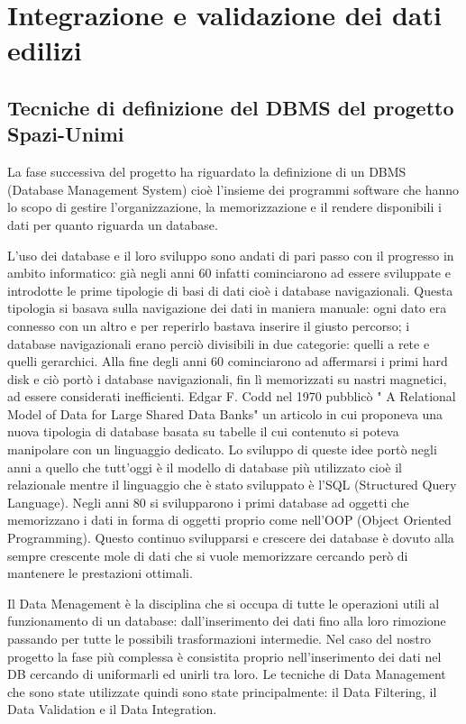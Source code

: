 \documentclass[12pt]{report}
\begin{document}
\chapter{Integrazione e validazione dei dati edilizi}
\label{cap2}

\section{Tecniche di definizione del DBMS del progetto Spazi-Unimi}

La fase successiva del progetto ha riguardato la definizione di un DBMS (Database Management System) cioè l'insieme dei programmi software che hanno lo scopo di gestire l'organizzazione, la memorizzazione e il rendere disponibili i dati per quanto riguarda un database.

L'uso dei database e il loro sviluppo sono andati di pari passo con il progresso in ambito informatico: già negli anni 60 infatti cominciarono ad essere sviluppate e introdotte le prime tipologie di basi di dati cioè i database navigazionali. 
Questa tipologia si basava sulla navigazione dei dati in maniera manuale: ogni dato era connesso con un altro e per reperirlo bastava inserire il giusto percorso; i database navigazionali erano perciò divisibili in due categorie: quelli a rete e quelli gerarchici.
Alla fine degli anni 60 cominciarono ad affermarsi i primi hard disk e ciò portò i database navigazionali, fin lì memorizzati su nastri magnetici, ad essere considerati inefficienti. 
Edgar F. Codd nel 1970 pubblicò " A Relational Model of Data for Large Shared Data Banks" un articolo in cui proponeva una nuova tipologia di database basata su tabelle il cui contenuto si poteva manipolare con un linguaggio dedicato.
Lo sviluppo di queste idee portò negli anni a quello che tutt'oggi è il modello di database più utilizzato cioè il relazionale mentre il linguaggio che è stato sviluppato è l'SQL (Structured Query Language).
Negli anni 80 si svilupparono i primi database ad oggetti che memorizzano i dati in forma di oggetti proprio come nell'OOP (Object Oriented Programming).
Questo continuo svilupparsi e crescere dei database è dovuto alla sempre crescente mole di dati che si vuole memorizzare cercando però di mantenere le prestazioni ottimali. 

Il Data Menagement è la disciplina che si occupa di tutte le operazioni utili al funzionamento di un database: dall'inserimento dei dati fino alla loro rimozione passando per tutte le possibili trasformazioni intermedie.
Nel caso del nostro progetto la fase più complessa è consistita proprio nell'inserimento dei dati nel DB cercando di uniformarli ed unirli tra loro. 
Le tecniche di Data Management che sono state utilizzate quindi sono state principalmente: il Data Filtering, il Data Validation e il Data Integration.
\end{document}
